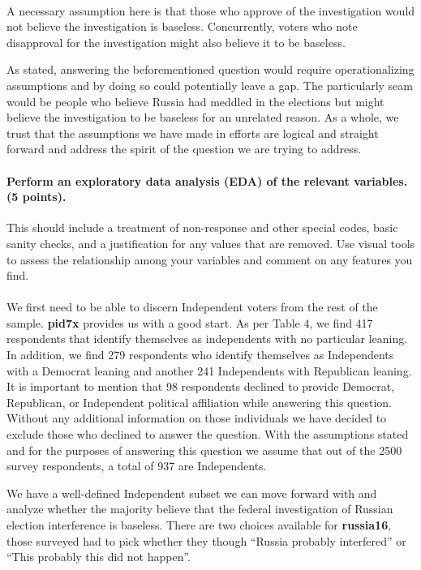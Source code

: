 \documentclass[12pt]{article}
\begin{document}
\paragraph{}
A necessary assumption here is that those who approve of the investigation would not believe the investigation is baseless. Concurrently, voters who note disapproval for the investigation might also believe it to be baseless.

As stated, answering the beforementioned question would require operationalizing assumptions and by doing so could potentially leave a gap. The particularly seam would be people who believe Russia had meddled in the elections but might believe the investigation to be baseless for an unrelated reason. As a whole, we trust that the assumptions we have made in efforts are logical and straight forward and address the spirit of the question we are trying to address.

\paragraph{Perform an exploratory data analysis (EDA) of the relevant variables. (5 points).}
This should include a treatment of non-response and other special codes, basic sanity checks, and a justification for any values that are removed. Use visual tools to assess the relationship among your variables and comment on any features you find.

\paragraph{}
We first need to be able to discern Independent voters from the rest of the sample. \textbf{pid7x} provides us with a good start. As per Table 4, we find 417 respondents that identify themselves as independents with no particular leaning. In addition, we find 279 respondents who identify themselves as Independents with a Democrat leaning and another 241 Independents with Republican leaning. It is important to mention that 98 respondents declined to provide Democrat, Republican, or Independent political affiliation while answering this question. Without any additional information on those individuals we have decided to exclude those who declined to answer the question. With the assumptions stated and for the purposes of answering this question we assume that out of the 2500 survey respondents, a total of 937 are Independents.

We have a well-defined Independent subset we can move forward with and analyze whether the majority believe that the federal investigation of Russian election interference is baseless.
There are two choices available for \textbf{russia16}, those surveyed had to pick whether they though “Russia probably interfered” or “This probably this did not happen”. 
\end{document}
